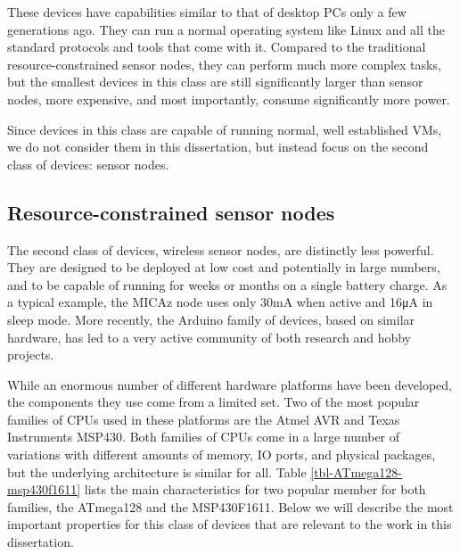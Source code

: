These devices have capabilities similar to that of desktop PCs only a few generations ago. They can run a normal operating system like Linux and all the standard protocols and tools that come with it. Compared to the traditional resource-constrained sensor nodes, they can perform much more complex tasks, but the smallest devices in this class are still significantly larger than sensor nodes, more expensive, and most importantly, consume significantly more power.

Since devices in this class are capable of running normal, well established VMs, we do not consider them in this dissertation, but instead focus on the second class of devices: sensor nodes.

\subsection{Resource-constrained sensor nodes}
The second class of devices, wireless sensor nodes, are distinctly less powerful. They are designed to be deployed at low cost and potentially in large numbers, and to be capable of running for weeks or months on a single battery charge. As a typical example, the MICAz node \cite{CrossbowTechnology} uses only 30mA when active and 16μA in sleep mode. More recently, the Arduino family of devices, based on similar hardware, has led to a very active community of both research and hobby projects.

While an enormous number of different hardware platforms have been developed, the components they use come from a limited set. Two of the most popular families of CPUs used in these platforms are the Atmel AVR and Texas Instruments MSP430. Both families of CPUs come in a large number of variations with different amounts of memory, IO ports, and physical packages, but the underlying architecture is similar for all. Table \ref{tbl-ATmega128-msp430f1611} lists the main characteristics for two popular member for both families, the ATmega128 and the MSP430F1611. Below we will describe the most important properties for this class of devices that are relevant to the work in this dissertation.

